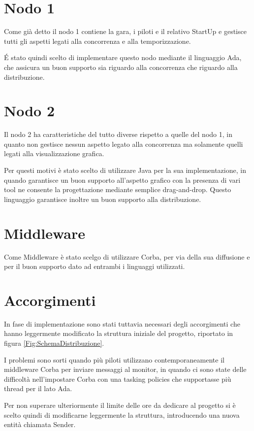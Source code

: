 \documentclass[a4paper,11pt, twoside, openright]{book}
\begin{document}
    \section {Nodo 1}
      Come già detto il nodo 1 contiene la gara, i piloti e il relativo StartUp e gestisce tutti gli aspetti
      legati alla concorrenza e alla temporizzazione.
      
      É stato quindi scelto di implementare questo nodo mediante il linguaggio Ada, che assicura un buon supporto sia
      riguardo alla concorrenza che riguardo alla distribuzione.
      
    \section{Nodo 2}
      Il nodo 2 ha caratteristiche del tutto diverse rispetto a quelle del nodo 1, in quanto non gestisce nessun aspetto
      legato alla concorrenza ma solamente quelli legati alla visualizzazione grafica.
      
      Per questi motivi è stato scelto di utilizzare Java per la sua implementazione, in quando garantisce un buon supporto
      all'aspetto grafico con la presenza di vari tool ne consente la progettazione mediante semplice drag-and-drop.
      Questo linguaggio garantisce inoltre un buon supporto alla distribuzione.
      
    \section{Middleware}
      Come Middleware è stato scelgo di utilizzare Corba, per via della sua diffusione e per il buon supporto dato
      ad entrambi i linguaggi utilizzati.
      
    \section{Accorgimenti}
      In fase di implementazione sono stati tuttavia necessari degli accorgimenti che hanno leggermente modificato la struttura 
      iniziale del progetto, riportato in figura \ref{Fig:SchemaDistribuzione}.
      
      I problemi sono sorti quando più piloti utilizzano contemporaneamente il middleware Corba per 
      inviare messaggi al monitor, in quando
      ci sono state delle difficoltà nell'impostare Corba con una tasking policies che supportasse più thread per il lato Ada.
      
      Per non superare ulteriormente il limite delle ore da dedicare al progetto si è scelto quindi di modificarne leggermente
      la struttura, introducendo una nuova entità chiamata Sender.
      
\end{document}
